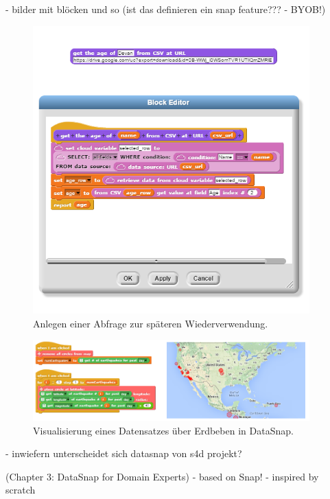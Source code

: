 - bilder mit blöcken und so (ist das definieren ein snap feature??? - BYOB!)

\begin{figure}[!ht]
  \centering
    \includegraphics[width=0.95\textwidth]{assets/datasnap-block-definition.png}
  \caption{Anlegen einer Abfrage zur späteren Wiederverwendung. \parencite{hellmannDataSnapEnabling2015}}
  \label{fig:datasnap-block-definition}
\end{figure}

\begin{figure}[!ht]
  \centering
    \includegraphics[width=0.95\textwidth]{assets/datasnap-visualization.png}
  \caption{Visualisierung eines Datensatzes über Erdbeben in DataSnap. \parencite{hellmannDataSnapEnabling2015}}
  \label{fig:datasnap-visualization}
\end{figure}

- inwiefern unterscheidet sich datasnap von s4d projekt?


\parencite{hellmannDataSnapEnabling2015} (Chapter 3: DataSnap for Domain Experts)
- based on Snap! 
  - inspired by scratch 
